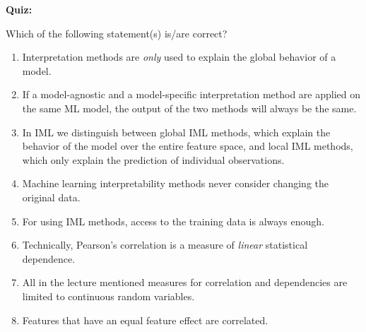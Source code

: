 \textbf{Quiz:}\\ \noindent
\vspace{0.1cm}

Which of the following statement(s) is/are correct?  
\begin{enumerate}
    \item Interpretation methods are \textit{only} used to explain the global behavior of a model. 

    
    \item If a model-agnostic and a model-specific interpretation method are applied on the same ML model, the output of the two methods will always be the same.
    
    \item In IML we distinguish between global IML methods, which explain the behavior of the model over the entire feature space, and local IML methods, which only explain the prediction of individual observations. 
    

    \item Machine learning interpretability methods never consider changing the original data.
            
    
    \item For using IML methods, access to the training data is always enough.
    
    \item Technically, Pearson's correlation is a measure of \textit{linear} statistical dependence. 
    
    \item All in the lecture mentioned measures for correlation and dependencies are limited to continuous random variables.
    
    \item Features that have an equal feature effect are correlated. 


\end{enumerate}
